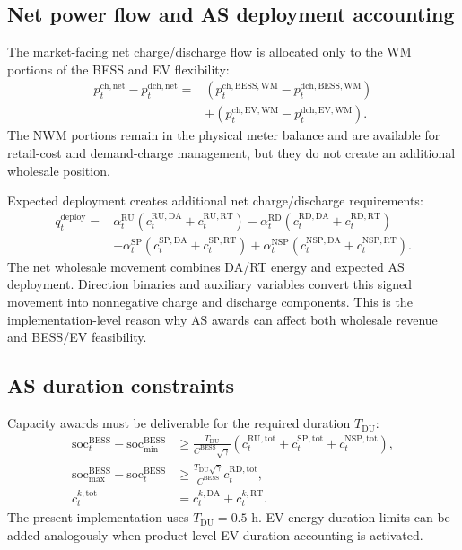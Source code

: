 \documentclass[final,5p,times]{elsarticle}
\newcommand{\EV}{\mathrm{EV}}
\newcommand{\BESS}{\mathrm{BESS}}
\newcommand{\DA}{\mathrm{DA}}
\newcommand{\RT}{\mathrm{RT}}
\newcommand{\soc}{\mathrm{soc}}
\newcommand{\RU}{\mathrm{RU}}
\newcommand{\RD}{\mathrm{RD}}
\newcommand{\SP}{\mathrm{SP}}
\newcommand{\NSP}{\mathrm{NSP}}
\newcommand{\WM}{\mathrm{WM}}
\newcommand{\ch}{\mathrm{ch}}
\newcommand{\dch}{\mathrm{dch}}
\newcommand{\tot}{\mathrm{tot}}
\newcommand{\net}{\mathrm{net}}
\newcommand{\deploy}{\mathrm{deploy}}
\begin{document}
\subsection{Net power flow and AS deployment accounting}
The market-facing net charge/discharge flow is allocated only to the WM portions of the BESS and EV flexibility:
\begin{align}
p_t^{\ch,\net}-p_t^{\dch,\net}
={}&\left(p_t^{\ch,\BESS,\WM}-p_t^{\dch,\BESS,\WM}\right)\nonumber\\
&+\left(p_t^{\ch,\EV,\WM}-p_t^{\dch,\EV,\WM}\right).
\label{eq:app_net_wm_flow}
\end{align}
The NWM portions remain in the physical meter balance and are available for retail-cost and demand-charge management, but they do not create an additional wholesale position.

Expected deployment creates additional net charge/discharge requirements:
\begin{align}
q_t^{\deploy}=&\alpha_t^{\RU}(c_t^{\RU,\DA}+c_t^{\RU,\RT})-
\alpha_t^{\RD}(c_t^{\RD,\DA}+c_t^{\RD,\RT})\nonumber\\
&+\alpha_t^{\SP}(c_t^{\SP,\DA}+c_t^{\SP,\RT})+
\alpha_t^{\NSP}(c_t^{\NSP,\DA}+c_t^{\NSP,\RT}).\label{eq:app_deploy}
\end{align}
The net wholesale movement combines DA/RT energy and expected AS deployment. Direction binaries and auxiliary variables convert this signed movement into nonnegative charge and discharge components. This is the implementation-level reason why AS awards can affect both wholesale revenue and BESS/EV feasibility.

\subsection{AS duration constraints}
Capacity awards must be deliverable for the required duration $T_{\mathrm{DU}}$:
\begin{align}
\soc_t^{\BESS}-\soc_{\min}^{\BESS}
&\ge \frac{T_{\mathrm{DU}}}{C^{\BESS}\sqrt{\gamma}}
\left(c_t^{\RU,\tot}+c_t^{\SP,\tot}+c_t^{\NSP,\tot}\right),\label{eq:app_duration_up}\\
\soc_{\max}^{\BESS}-\soc_t^{\BESS}
&\ge \frac{T_{\mathrm{DU}}\sqrt{\gamma}}{C^{\BESS}}c_t^{\RD,\tot},\label{eq:app_duration_down}\\
c_t^{k,\tot}&=c_t^{k,\DA}+c_t^{k,\RT}.\label{eq:app_capacity_total}
\end{align}
The present implementation uses $T_{\mathrm{DU}}=0.5$ h. EV energy-duration limits can be added analogously when product-level EV duration accounting is activated.
\end{document}
